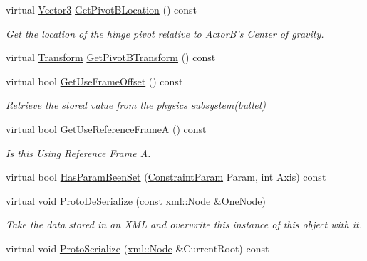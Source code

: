 \begin{DoxyCompactItemize}
\item 
virtual \hyperlink{classMezzanine_1_1Vector3}{Vector3} \hyperlink{classMezzanine_1_1HingeConstraint_a87b14b3cbf5241aeba723226661764e6}{GetPivotBLocation} () const 
\begin{DoxyCompactList}\small\item\em Get the location of the hinge pivot relative to ActorB's Center of gravity. \item\end{DoxyCompactList}\item 
virtual \hyperlink{classMezzanine_1_1Transform}{Transform} \hyperlink{classMezzanine_1_1HingeConstraint_a7d9a9ddc367d1a9105f1eb27fd76a65f}{GetPivotBTransform} () const 
\item 
virtual bool \hyperlink{classMezzanine_1_1HingeConstraint_a09dc1bb27e02b619222aebea91bc6705}{GetUseFrameOffset} () const 
\begin{DoxyCompactList}\small\item\em Retrieve the stored value from the physics subsystem(bullet) \item\end{DoxyCompactList}\item 
virtual bool \hyperlink{classMezzanine_1_1HingeConstraint_a638b7b76542d850becea2d49d3f1c8b1}{GetUseReferenceFrameA} () const 
\begin{DoxyCompactList}\small\item\em Is this Using Reference Frame A. \item\end{DoxyCompactList}\item 
virtual bool \hyperlink{classMezzanine_1_1HingeConstraint_a58f5758cb5926f785c07c7ebb544d91b}{HasParamBeenSet} (\hyperlink{namespaceMezzanine_a6c62e8c2938fb203eb7a7072c12176f4}{ConstraintParam} Param, int Axis) const 
\item 
virtual void \hyperlink{classMezzanine_1_1HingeConstraint_a6cbd8328c7a047f8e7951ab482e733cb}{ProtoDeSerialize} (const \hyperlink{classMezzanine_1_1xml_1_1Node}{xml::Node} \&OneNode)
\begin{DoxyCompactList}\small\item\em Take the data stored in an XML and overwrite this instance of this object with it. \item\end{DoxyCompactList}\item 
virtual void \hyperlink{classMezzanine_1_1HingeConstraint_a49cf5f27bff730ee30ff52a741e35f2e}{ProtoSerialize} (\hyperlink{classMezzanine_1_1xml_1_1Node}{xml::Node} \&CurrentRoot) const 

\end{DoxyCompactItemize}
